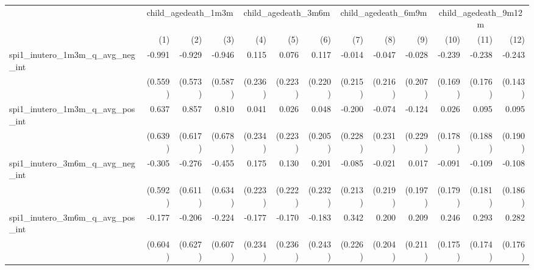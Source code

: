 \begin{tabular}{lrrrrrrrrrrrr}
\toprule
                                            &  \multicolumn{3}{c}{child\_agedeath\_1m3m} &  \multicolumn{3}{c}{child\_agedeath\_3m6m} &  \multicolumn{3}{c}{child\_agedeath\_6m9m} & \multicolumn{3}{c}{child\_agedeath\_9m12m} \\ 
\cmidrule(lr){2-4} \cmidrule(lr){5-7} \cmidrule(lr){8-10} \cmidrule(lr){11-13} 
                                            &          (1) &          (2) &          (3) &          (4) &          (5) &          (6) &          (7) &          (8) &          (9) &         (10) &         (11) &         (12) \\ 
\midrule
spi1\_inutero\_1m3m\_q\_avg\_neg\_int       &       -0.991 &       -0.929 &       -0.946 &        0.115 &        0.076 &        0.117 &       -0.014 &       -0.047 &       -0.028 &       -0.239 &       -0.238 &       -0.243 \\ 
                                            &      (0.559) &      (0.573) &      (0.587) &      (0.236) &      (0.223) &      (0.220) &      (0.215) &      (0.216) &      (0.207) &      (0.169) &      (0.176) &      (0.143) \\ 
spi1\_inutero\_1m3m\_q\_avg\_pos\_int       &        0.637 &        0.857 &        0.810 &        0.041 &        0.026 &        0.048 &       -0.200 &       -0.074 &       -0.124 &        0.026 &        0.095 &        0.095 \\ 
                                            &      (0.639) &      (0.617) &      (0.678) &      (0.234) &      (0.223) &      (0.205) &      (0.228) &      (0.231) &      (0.229) &      (0.178) &      (0.188) &      (0.190) \\ 
spi1\_inutero\_3m6m\_q\_avg\_neg\_int       &       -0.305 &       -0.276 &       -0.455 &        0.175 &        0.130 &        0.201 &       -0.085 &       -0.021 &        0.017 &       -0.091 &       -0.109 &       -0.108 \\ 
                                            &      (0.592) &      (0.611) &      (0.634) &      (0.223) &      (0.222) &      (0.232) &      (0.213) &      (0.219) &      (0.197) &      (0.179) &      (0.181) &      (0.186) \\ 
spi1\_inutero\_3m6m\_q\_avg\_pos\_int       &       -0.177 &       -0.206 &       -0.224 &       -0.177 &       -0.170 &       -0.183 &        0.342 &        0.200 &        0.209 &        0.246 &        0.293 &        0.282 \\ 
                                            &      (0.604) &      (0.627) &      (0.607) &      (0.234) &      (0.236) &      (0.243) &      (0.226) &      (0.204) &      (0.211) &      (0.175) &      (0.174) &      (0.176) \\ 

\end{tabular}
